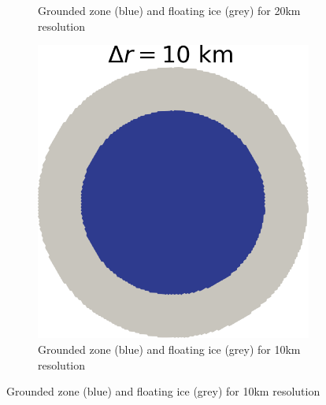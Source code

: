 \documentclass{article}
\begin{document}
\begin{figure}[!h]
\begin{subfigure}{0.25\textwidth}
		\caption{Grounded zone (blue) and floating ice (grey) for 20km resolution}
		\label{figCONE20}
	\end{subfigure}\hfil %
	\begin{subfigure}{0.25\textwidth}
		\includegraphics[width=\linewidth]{../fig/Grounded_zone_10km_CONE.png}
		\caption{Grounded zone (blue) and floating ice (grey) for 10km resolution}
		\label{figCONE10KM}
	\end{subfigure}
	

\end{figure}
\end{document}
